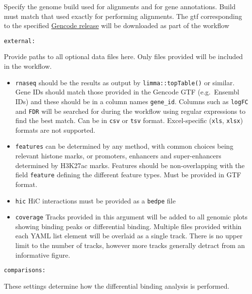 \documentclass[
]{book}
\providecommand{\tightlist}{%
  \setlength{\itemsep}{0pt}\setlength{\parskip}{0pt}}
\begin{document}
Specify the genome build used for alignments and for gene annotations.
Build must match that used exactly for performing alignments.
The gtf corresponding to the specified \href{https://www.gencodegenes.org/}{Gencode release} will be downloaded as part of the workflow

\texttt{external:}

Provide paths to all optional data files here.
Only files provided will be included in the workflow.

\begin{itemize}
\tightlist
\item
  \texttt{rnaseq} should be the results as output by \texttt{limma::topTable()} or similar. Gene IDs should match those provided in the Gencode GTF (e.g.~Ensembl IDs) and these should be in a column names \texttt{gene\_id}. Columns such as \texttt{logFC} and \texttt{FDR} will be searched for during the workflow using regular expressions to find the best match. Can be in \texttt{csv} or \texttt{tsv} format. Excel-specific (\texttt{xls}, \texttt{xlsx}) formats are not supported.
\item
  \texttt{features} can be determined by any method, with common choices being relevant histone marks, or promoters, enhancers and super-enhancers determined by H3K27ac marks. Features should be non-overlapping with the field \texttt{feature} defining the different feature types. Must be provided in GTF format.
\item
  \texttt{hic} HiC interactions must be provided as a \texttt{bedpe} file
\item
  \texttt{coverage} Tracks provided in this argument will be added to all genomic plots showing binding peaks or differential binding. Multiple files provided within each YAML list element will be overlaid as a single track. There is no upper limit to the number of tracks, however more tracks generally detract from an informative figure.
\end{itemize}

\texttt{comparisons:}

These settings determine how the differential binding analysis is performed.
\end{document}

